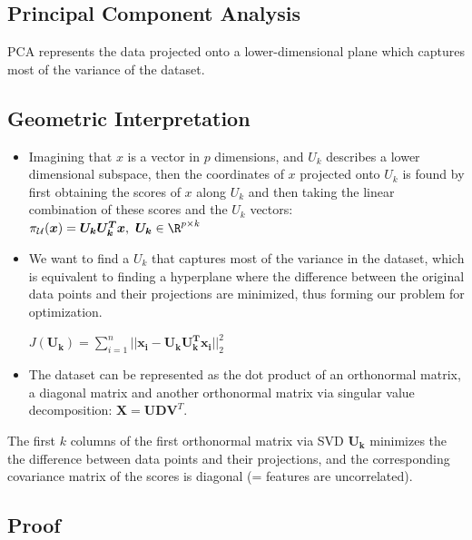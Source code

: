 \documentclass[english]{latex4ei/latex4ei_sheet}
\begin{document}
\begin{sectionbox}
\section{Principal Component Analysis}
PCA represents the data projected onto a lower-dimensional plane which captures most of the variance of the dataset.
\subsection{Geometric Interpretation}
\begin{itemize}
\item Imagining that $x$ is a vector in $p$ dimensions, and $U_k$ describes a lower dimensional subspace, then the coordinates of $x$ projected onto $U_k$ is found by first obtaining the scores of $x$ along $U_k$ and then taking the linear combination of these scores and the $U_k$ vectors: $\pi_\mathcal{U}(\boldsymbol{x})=\boldsymbol{U_kU_k^Tx}, \ \boldsymbol{U_k}\in\R^{p\times k}$
\item We want to find a $U_k$ that captures most of the variance in the dataset, which is equivalent to finding a hyperplane where the difference between the original data points and their projections are minimized, thus forming our problem for optimization.\\
\begin{center}
    $J(\boldsymbol{U_k})=\sum\limits_{i=1}^n||\boldsymbol{x_i}-\boldsymbol{U_kU_k^Tx_i}||^2_2$
\end{center}
\item The dataset can be represented as the dot product of an orthonormal matrix, a diagonal matrix and another orthonormal matrix via singular value decomposition: $\boldsymbol{X}=\boldsymbol{UDV}^T$.
\end{itemize}
\begin{emphbox}
    The first $k$ columns of the first orthonormal matrix via SVD $\boldsymbol{U_k}$ minimizes the the difference between data points and their projections, and the corresponding covariance matrix of the scores is diagonal (= features are uncorrelated).
\end{emphbox}
\begin{itemize}
\subsection{Proof}


\end{itemize}
\end{sectionbox}
\end{document}
